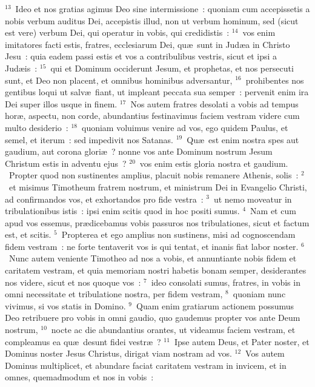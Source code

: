 ${}^{13}$~Ideo et nos gratias agimus Deo sine intermissione~: quoniam cum accepissetis a nobis verbum auditus Dei, accepistis illud, non ut verbum hominum, sed (sicut est vere) verbum Dei, qui operatur in vobis, qui credidistis~:
${}^{14}$~vos enim imitatores facti estis, fratres, ecclesiarum Dei, qu\ae\ sunt in Jud\ae a in Christo Jesu~: quia eadem passi estis et vos a contribulibus vestris, sicut et ipsi a Jud\ae is~:
${}^{15}$~qui et Dominum occiderunt Jesum, et prophetas, et nos persecuti sunt, et Deo non placent, et omnibus hominibus adversantur,
${}^{16}$~prohibentes nos gentibus loqui ut salv\ae\ fiant, ut impleant peccata sua semper~: pervenit enim ira Dei super illos usque in finem.
${}^{17}$~Nos autem fratres desolati a vobis ad tempus hor\ae , aspectu, non corde, abundantius festinavimus faciem vestram videre cum multo desiderio~:
${}^{18}$~quoniam voluimus venire ad vos, ego quidem Paulus, et semel, et iterum~: sed impedivit nos Satanas.
${}^{19}$~Qu\ae\ est enim nostra spes aut gaudium, aut corona glori\ae~? nonne vos ante Dominum nostrum Jesum Christum estis in adventu ejus~?
${}^{20}$~vos enim estis gloria nostra et gaudium.
~Propter quod non sustinentes amplius, placuit nobis remanere Athenis, solis~:
${}^{2}$~et misimus Timotheum fratrem nostrum, et ministrum Dei in Evangelio Christi, ad confirmandos vos, et exhortandos pro fide vestra~:
${}^{3}$~ut nemo moveatur in tribulationibus istis~: ipsi enim scitis quod in hoc positi sumus.
${}^{4}$~Nam et cum apud vos essemus, pr\ae dicebamus vobis passuros nos tribulationes, sicut et factum est, et scitis.
${}^{5}$~Propterea et ego amplius non sustinens, misi ad cognoscendam fidem vestram~: ne forte tentaverit vos is qui tentat, et inanis fiat labor noster.
${}^{6}$~Nunc autem veniente Timotheo ad nos a vobis, et annuntiante nobis fidem et caritatem vestram, et quia memoriam nostri habetis bonam semper, desiderantes nos videre, sicut et nos quoque vos~:
${}^{7}$~ideo consolati sumus, fratres, in vobis in omni necessitate et tribulatione nostra, per fidem vestram,
${}^{8}$~quoniam nunc vivimus, si vos statis in Domino.
${}^{9}$~Quam enim gratiarum actionem possumus Deo retribuere pro vobis in omni gaudio, quo gaudemus propter vos ante Deum nostrum,
${}^{10}$~nocte ac die abundantius orantes, ut videamus faciem vestram, et compleamus ea qu\ae\ desunt fidei vestr\ae~?
${}^{11}$~Ipse autem Deus, et Pater noster, et Dominus noster Jesus Christus, dirigat viam nostram ad vos.
${}^{12}$~Vos autem Dominus multiplicet, et abundare faciat caritatem vestram in invicem, et in omnes, quemadmodum et nos in vobis~:
